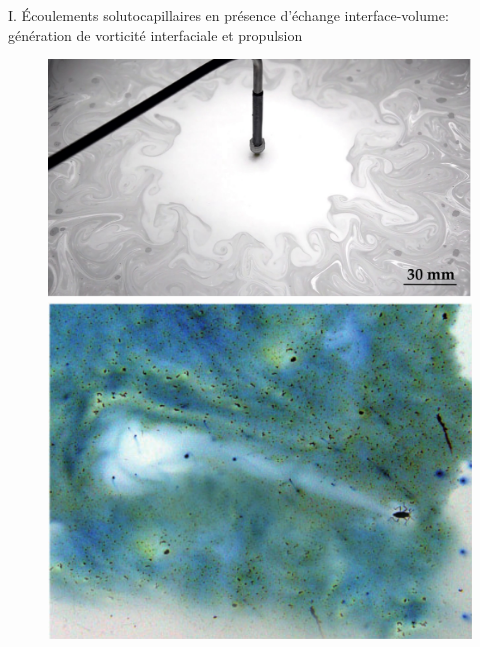 \documentclass[aspectratio=169,10pt]{beamer}
\begin{document}
\begin{frame}{I. Écoulements solutocapillaires en présence d'échange interface-volume: génération de vorticité interfaciale et propulsion}
    \begin{figure}[!ht]
        \begin{minipage}[c]{.45\textwidth}
        \includegraphics[width=1\textwidth]{./figures/Ecoulement_Marangoni.pdf}
        \end{minipage}\hfill
        \begin{minipage}[c]{.45\textwidth}
        \includegraphics[width=.72\textwidth]{./figures/microvelia.png}
        \end{minipage}
    \end{figure}
\end{frame}

%       
\end{document}
